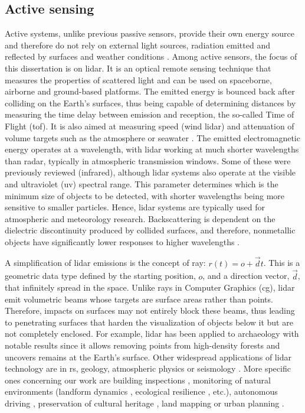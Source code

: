 \subsection{Active sensing}

Active systems, unlike previous passive sensors, provide their own energy source and therefore do not rely on external light sources, radiation emitted and reflected by surfaces and weather conditions \cite{dong_lidar_2018}. Among active sensors, the focus of this dissertation is on \acrshort{lidar}. It is an optical remote sensing technique that measures the properties of scattered light and can be used on spaceborne, airborne and ground-based platforms. The emitted energy is bounced back after colliding on the Earth's surfaces, thus being capable of determining distances by measuring the time delay between emission and reception, the so-called Time of Flight (\acrshort{tof}). It is also aimed at measuring speed (wind \acrshort{lidar}) and attenuation of volume targets such as the atmosphere or seawater \cite{emery_introduction_2017}. The emitted electromagnetic energy operates at a wavelength, with \acrshort{lidar} working at much shorter wavelengths than radar, typically in atmospheric transmission windows. Some of these were previously reviewed (infrared), although \acrshort{lidar} systems also operate at the visible and ultraviolet (\acrshort{uv}) spectral range. This parameter determines which is the minimum size of objects to be detected, with shorter wavelengths being more sensitive to smaller particles. Hence, \acrshort{lidar} systems are typically used for atmospheric and meteorology research. Backscattering is dependent on the dielectric discontinuity produced by collided surfaces, and therefore, nonmetallic objects have significantly lower responses to higher wavelengths \cite{dong_lidar_2018}. 

A simplification of \acrshort{lidar} emissions is the concept of ray: $r(t) = o + \vec{d}t$. This is a geometric data type defined by the starting position, $o$, and a direction vector, $\vec{d}$, that infinitely spread in the space. Unlike rays in Computer Graphics (\acrshort{cg}), \acrshort{lidar} emit volumetric beams whose targets are surface areas rather than points. Therefore, impacts on surfaces may not entirely block these beams, thus leading to penetrating surfaces that harden the visualization of objects below it but are not completely enclosed. For example, \acrshort{lidar} has been applied to archaeology with notable results since it allows removing points from high-density forests and uncovers remains at the Earth's surface. Other widespread applications of \acrshort{lidar} technology are in \acrshort{rs}, geology, atmospheric physics or seismology \cite{emery_introduction_2017}. More specific ones concerning our work are building inspections \cite{shariq_revolutionising_2020}, monitoring of natural environments (landform dynamics \cite{guisado-pintado_3d_2019}, ecological resilience \cite{mitasova_geospatial_2010}, etc.), autonomous driving \cite{kuutti_survey_2021}, preservation of cultural heritage \cite{andriasyan_point_2020}, land mapping or urban planning \cite{zhou_street-view_2022}.

